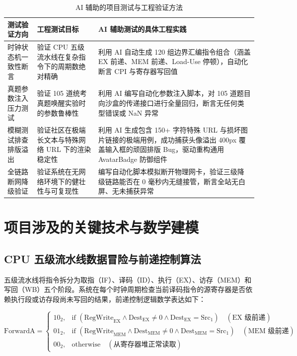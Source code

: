 \documentclass[UTF8,a4paper,11pt]{ctexart}
\begin{document}
\begin{table}[htbp]
\centering
\small
\caption{AI 辅助的项目测试与工程验证方法}
\begin{tabularx}{\textwidth}{p{3.2cm}p{3.5cm}X}
\toprule
\textbf{测试验证方向} & \textbf{工程测试目标} & \textbf{AI 辅助测试的具体工程实践} \\
\midrule
时钟状态机一致性断言 & 验证 CPU 五级流水线在复杂指令下的周期数绝对精确 & 利用 AI 自动生成 120 组边界汇编指令组合（涵盖 EX 前递、MEM 前递、Load-Use 停顿），自动化断言 CPI 与寄存器写回值 \\
真题参数注入压力测试 & 验证 105 道统考真题唤醒实验时的参数鲁棒性 & 利用 AI 编写自动化参数注入脚本，对 105 道题目向沙盒的传递接口进行全量回归，断言无任何类型错误或 NaN 异常 \\
模糊测试排查排版溢出 & 验证社区在极端长文本与特殊网络 URL 下的渲染稳定性 & 利用 AI 生成包含 150+ 字符特殊 URL 与损坏图片链接的极端用例，成功捕获头像溢出 400px 覆盖输入框的顽固排版 Bug，驱动重构通用 AvatarBadge 防御组件 \\
全链路断网降级验证 & 验证系统在无网络环境下的健壮性与可复现性 & 编写自动化脚本模拟断开物理网卡，验证三级降级链路能否在 0 毫秒内无缝接管，断言全站无白屏、无未捕获异常 \\
\bottomrule
\end{tabularx}
\end{table}

\section{项目涉及的关键技术与数学建模}

\subsection{CPU 五级流水线数据冒险与前递控制算法}
五级流水线将指令拆分为取指（IF）、译码（ID）、执行（EX）、访存（MEM）和写回（WB）五个阶段。系统在每个时钟周期检查当前译码指令的源寄存器是否依赖执行段或访存段尚未写回的结果，前递控制逻辑数学表达如下：

\begin{equation}
\text{ForwardA} = 
\begin{cases}
10_2, & \text{if } (\text{RegWrite}_{\text{EX}} \land \text{Dest}_{\text{EX}} \neq 0 \land \text{Dest}_{\text{EX}} = \text{Src}_1) \quad (\text{EX 级前递}) \\
01_2, & \text{if } (\text{RegWrite}_{\text{MEM}} \land \text{Dest}_{\text{MEM}} \neq 0 \land \text{Dest}_{\text{MEM}} = \text{Src}_1) \quad (\text{MEM 级前递}) \\
00_2, & \text{otherwise} \quad (\text{从寄存器堆正常读取})
\end{cases}
\end{equation}
\end{document}
